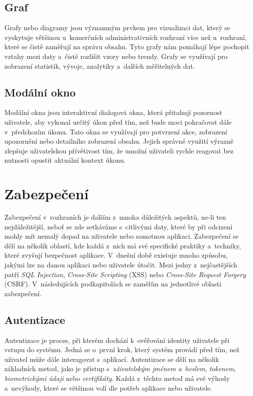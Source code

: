 \subsection*{Graf}
\label{subsec:admin-tags-chart}
Grafy nebo diagramy jsou významným prvkem pro vizualizaci dat, který se vyskytuje většinou u~komerčních administrativních rozhraní více než u~rozhraní, které se čistě zaměřují na správu obsahu. Tyto grafy nám pomáhají lépe pochopit vztahy mezi daty a~čistě rozlišit vzory nebo trendy. Grafy se využívají pro zobrazení statistik, vývoje, analytiky a~dalších měřitelných dat.

\subsection*{Modální okno}
\label{subsec:admin-tags-modal}
Modální okna jsou interaktivní dialogová okna, která přitahují pozornost uživatele, aby vykonal určitý úkon před tím, než bude moci pokračovat dále v~předchozím úkonu. Tato okna se využívají pro potvrzení akce, zobrazení upozornění nebo detailního zobrazení obsahu. Jejich správné využití výrazně zlepšuje uživatelskou přívětivost tím, že umožní uživateli rychle reagovat bez nutnosti opustit aktuální kontext úkonu.

\section{Zabezpečení}
\label{sec:security}
Zabezpečení v~rozhraních je dalším z~mnoha důležitých aspektů, ne-li ten nejdůležitější, neboť se zde setkáváme s~citlivými daty, které by při odcizení mohly mít nemalý dopad na uživatele nebo samotnou aplikaci. Zabezpečení se dělí na několik oblastí, kde každá z~nich má své specifické praktiky a~techniky, které zvyšují bezpečnost aplikace. V~dnešní době existuje mnoho způsobu, jakými lze na danou aplikaci nebo uživatele útočit. Mezi jedny z~nejčastějších patří \textit{SQL Injection}, \textit{Cross-Site Scripting} (XSS) nebo \textit{Cross-Site Request Forgery} (CSRF). V~následujících podkapitolách se zaměřím na jednotlivé oblasti zabezpečení.

\subsection{Autentizace}
\label{subsec:security-authentication}
Autentizace je proces, při kterém dochází k~ověřování identity uživatele při vstupu do systému. Jedná se o~první krok, který systém provádí před tím, než uživatel může dále interagovat s~aplikací. Autentizace se dělí na několik základních metod, jako je přístup s~\textit{uživatelským jménem a~heslem}, \textit{tokenem}, \textit{biometrickými údaji} nebo \textit{certifikáty}. Každá z~těchto metod má své výhody a~nevýhody, které se většinou volí dle potřeb aplikace nebo uživatele.

